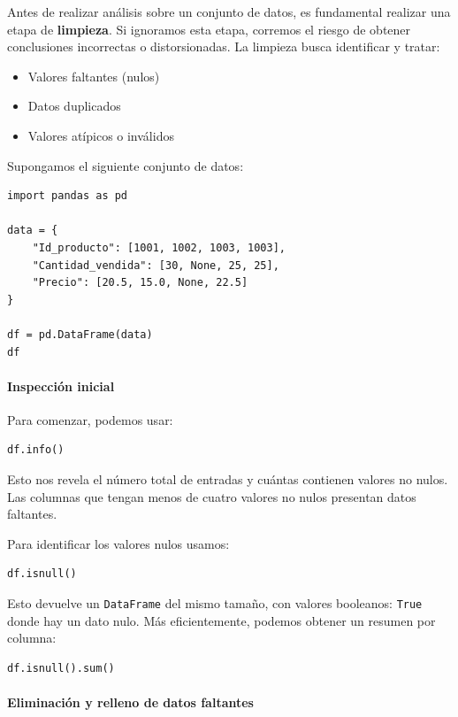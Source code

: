 \documentclass{article}
\theoremstyle{nonumberplain}
\begin{document}
Antes de realizar análisis sobre un conjunto de datos, es fundamental realizar una etapa de \textbf{limpieza}. Si ignoramos esta etapa, corremos el riesgo de obtener conclusiones incorrectas o distorsionadas. La limpieza busca identificar y tratar:

\begin{itemize}
    \item Valores faltantes (nulos)
    \item Datos duplicados
    \item Valores atípicos o inválidos
\end{itemize}

Supongamos el siguiente conjunto de datos:

\begin{verbatim}
import pandas as pd

data = {
    "Id_producto": [1001, 1002, 1003, 1003],
    "Cantidad_vendida": [30, None, 25, 25],
    "Precio": [20.5, 15.0, None, 22.5]
}

df = pd.DataFrame(data)
df
\end{verbatim}

\paragraph{Inspección inicial}

Para comenzar, podemos usar:

\begin{verbatim}
df.info()
\end{verbatim}

Esto nos revela el número total de entradas y cuántas contienen valores no nulos. Las columnas que tengan menos de cuatro valores no nulos presentan datos faltantes.

Para identificar los valores nulos usamos:

\begin{verbatim}
df.isnull()
\end{verbatim}

Esto devuelve un \texttt{DataFrame} del mismo tamaño, con valores booleanos: \texttt{True} donde hay un dato nulo. Más eficientemente, podemos obtener un resumen por columna:

\begin{verbatim}
df.isnull().sum()
\end{verbatim}

\paragraph{Eliminación y relleno de datos faltantes}
\end{document}
